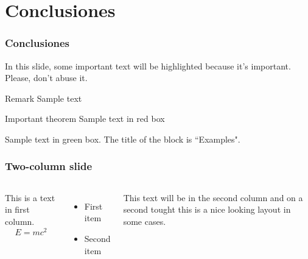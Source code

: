 \documentclass{beamer}
\begin{document}
\section{Conclusiones}

\begin{frame}
\frametitle{Conclusiones}

In this slide, some important text will be
\alert{highlighted} because it's important.
Please, don't abuse it.

\begin{block}{Remark}
Sample text
\end{block}

\begin{alertblock}{Important theorem}
Sample text in red box
\end{alertblock}

\begin{examples}
Sample text in green box. The title of the block is ``Examples".
\end{examples}
\end{frame}


\begin{frame}
\frametitle{Two-column slide}

\begin{columns}

This is a text in first column.
$$E=mc^2$$
\begin{itemize}
\item First item
\item Second item
\end{itemize}

This text will be in the second column
and on a second tought this is a nice looking
layout in some cases.
\end{columns}
\end{frame}
\end{document}
